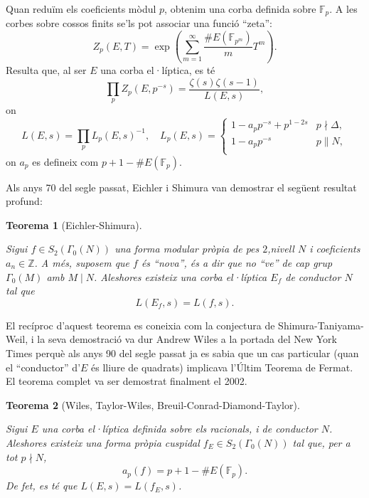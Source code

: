 \documentclass[
  letterpaper,
  DIV=11,
  numbers=noendperiod]{scrreprt}
\theoremstyle{plain}
\newtheorem{theorem}{Teorema}[chapter]
\theoremstyle{plain}
\theoremstyle{definition}
\theoremstyle{plain}
\theoremstyle{plain}
\theoremstyle{definition}
\theoremstyle{remark}
\begin{document}
Quan reduïm els coeficients mòdul \(p\), obtenim una corba definida
sobre \(\mathbb{F}_p\). A les corbes sobre cossos finits se'ls pot
associar una funció ``zeta'': \[
Z_p(E,T) = \exp\left(\sum_{m=1}^\infty \frac{\#E(\mathbb{F}_{p^{m}})}{m}T^m\right).
\] Resulta que, al ser \(E\) una corba el·líptica, es té \[
\prod_{p} Z_p(E,p^{-s}) = \frac{\zeta(s)\zeta(s-1)}{L(E,s)},
\] on \[
L(E,s) = \prod_{p} L_p(E,s)^{-1},\quad
L_p(E,s) = \begin{cases}
1-a_p p^{-s} + p^{1-2s}&p\nmid \Delta,\\
1-a_p p^{-s}&p\parallel N,\\
\end{cases}
\] on \(a_p\) es defineix com \(p+1-\#E(\mathbb{F}_p)\).

Als anys 70 del segle passat, Eichler i Shimura van demostrar el següent
resultat profund:

\begin{theorem}[Eichler-Shimura]\protect\hypertarget{thm-eichler-shimura}{}\label{thm-eichler-shimura}

Sigui \(f\in S_2(\Gamma_0(N))\) una forma modular pròpia de pes
\(2\),nivell \(N\) i coeficients \(a_n\in\mathbb{Z}\). A més, suposem
que \(f\) és ``nova'', és a dir que no ``ve'' de cap grup
\(\Gamma_0(M)\) amb \(M\mid N\). Aleshores existeix una corba el·líptica
\(E_f\) de conductor \(N\) tal que \[
L(E_f,s) = L(f,s).
\]

\end{theorem}

El recíproc d'aquest teorema es coneixia com la conjectura de
Shimura-Taniyama-Weil, i la seva demostració va dur Andrew Wiles a la
portada del New York Times perquè als anys 90 del segle passat ja es
sabia que un cas particular (quan el ``conductor'' d'\(E\) és lliure de
quadrats) implicava l'Últim Teorema de Fermat. El teorema complet va ser
demostrat finalment el 2002.

\begin{theorem}[Wiles, Taylor-Wiles,
Breuil-Conrad-Diamond-Taylor]\protect\hypertarget{thm-wiles}{}\label{thm-wiles}

Sigui \(E\) una corba el·líptica definida sobre els racionals, i de
conductor \(N\). Aleshores existeix una forma pròpia cuspidal
\(f_E\in S_2(\Gamma_0(N))\) tal que, per a tot \(p\nmid N\), \[
a_p(f) = p+1-\# E(\mathbb{F}_p).
\] De fet, es té que \(L(E,s) = L(f_E,s)\).

\end{theorem}
\end{document}
